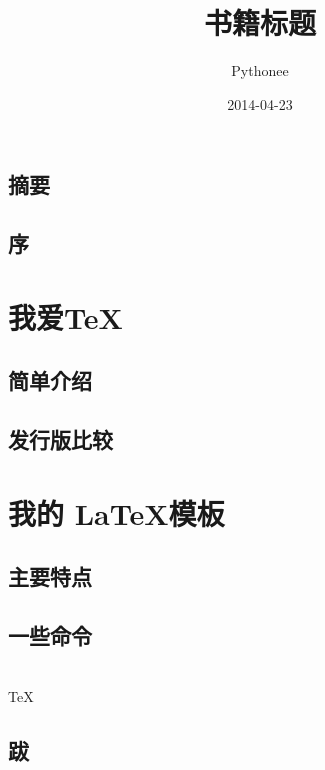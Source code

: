 \documentclass[fancyhdr,adobefonts,oneside,hyperref,openany,a4paper,UTF8]{ctexbook}
\author{Pythonee}
\title{书籍标题}
\date{2014-04-23}
\begin{document}
\maketitle


\frontmatter
\tableofcontents
\listoftables
\listoffigures
\setcounter{page}{0}
\chapter{摘要}
\lipsum[1]
\chapter{序}
\lipsum[1]


\mainmatter
\part{我爱\TeX}
\chapter{简单介绍}
\lipsum

\chapter{发行版比较}
\lipsum

\part{我的 \LaTeX 模板}
\chapter{主要特点}
\lipsum

\chapter{一些命令}
\cpp \\
\TeX \cite{knuth,lamport}

\backmatter
\chapter{跋}
\lipsum[1]

\appendix



\end{document}
